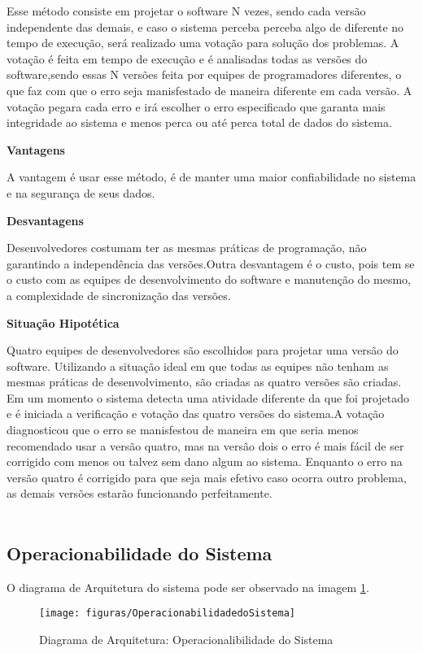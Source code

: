 Esse método consiste em projetar o software N vezes, sendo cada versão independente das demais, e caso o sistema perceba perceba algo de diferente no tempo de execução, será realizado uma votação para solução dos problemas. A votação é feita em tempo de execução e é analisadas todas as versões do software,sendo essas N versões feita por equipes de programadores diferentes, o que faz com que o erro seja manisfestado de maneira diferente em cada versão. A votação pegara cada erro e irá escolher o erro especificado que garanta mais integridade ao sistema e menos perca ou até perca total de dados do sistema.

\textbf{Vantagens}
\par
A vantagem é usar esse método, é de manter uma maior confiabilidade no sistema e na segurança de seus dados.

\textbf{Desvantagens}
\par
Desenvolvedores costumam ter as mesmas práticas de programação, não garantindo a independência das versões.Outra desvantagem é o custo, pois tem se o custo com as equipes de desenvolvimento do software e manutenção do mesmo, a complexidade de sincronização das versões.

\textbf{Situação Hipotética}
\par
Quatro equipes de desenvolvedores são escolhidos para projetar uma versão do software. Utilizando a situação ideal em que todas as equipes não tenham as mesmas práticas de desenvolvimento, são criadas as quatro versões são criadas. Em um momento o sistema detecta uma atividade diferente da que foi projetado e é iniciada a verificação e votação das quatro versões do sistema.A votação diagnosticou que o erro se manisfestou de maneira em que seria menos recomendado usar a versão quatro, mas na versão dois o erro é mais fácil de ser corrigido com menos ou talvez sem dano algum ao sistema. Enquanto o erro na versão quatro é corrigido para que seja mais efetivo caso ocorra outro problema, as demais versões estarão funcionando perfeitamente.
\\
\\

\subsection{Operacionabilidade do Sistema}

O diagrama de Arquitetura do sistema pode ser observado na imagem \ref{img:Operacionabilidade do Sistema}.

\begin{figure}[]
	\centering
	\caption{Diagrama de Arquitetura: Operacionalibilidade do Sistema}
	\texttt{[image: figuras/OperacionabilidadedoSistema]}
	\label{img:Operacionabilidade do Sistema}
\end{figure}

